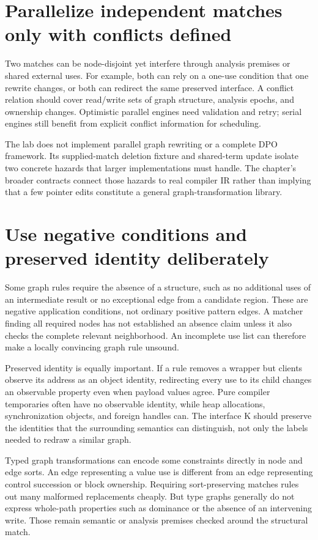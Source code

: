 \section{Parallelize independent matches only with conflicts defined}
\label{sec:ch87-parallel}
Two matches can be node-disjoint yet interfere through analysis premises or shared external uses.
For example, both can rely on a one-use condition that one rewrite changes, or both can redirect the same preserved interface.
A conflict relation should cover read/write sets of graph structure, analysis epochs, and ownership changes.
Optimistic parallel engines need validation and retry; serial engines still benefit from explicit conflict information for scheduling.

The lab does not implement parallel graph rewriting or a complete DPO framework.
Its supplied-match deletion fixture and shared-term update isolate two concrete hazards that larger implementations must handle.
The chapter's broader contracts connect those hazards to real compiler IR rather than implying that a few pointer edits constitute a general graph-transformation library.

\section{Use negative conditions and preserved identity deliberately}
\label{sec:ch87-negative}
Some graph rules require the absence of a structure, such as no additional uses of an intermediate result or no exceptional edge from a candidate region.
These are negative application conditions, not ordinary positive pattern edges.
A matcher finding all required nodes has not established an absence claim unless it also checks the complete relevant neighborhood.
An incomplete use list can therefore make a locally convincing graph rule unsound.

Preserved identity is equally important.
If a rule removes a wrapper but clients observe its address as an object identity, redirecting every use to its child changes an observable property even when payload values agree.
Pure compiler temporaries often have no observable identity, while heap allocations, synchronization objects, and foreign handles can.
The interface K should preserve the identities that the surrounding semantics can distinguish, not only the labels needed to redraw a similar graph.

Typed graph transformations can encode some constraints directly in node and edge sorts.
An edge representing a value use is different from an edge representing control succession or block ownership.
Requiring sort-preserving matches rules out many malformed replacements cheaply.
But type graphs generally do not express whole-path properties such as dominance or the absence of an intervening write.
Those remain semantic or analysis premises checked around the structural match.

